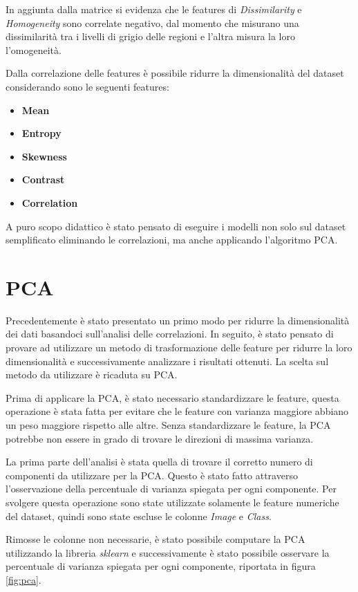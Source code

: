 In aggiunta dalla matrice si evidenza che le features di \textit{Dissimilarity}
e \textit{Homogeneity} sono correlate negativo, dal momento che misurano una dissimilarità
tra i livelli di grigio delle regioni e l'altra misura la loro l'omogeneità. 

Dalla correlazione delle features è possibile ridurre la dimensionalità del dataset
considerando sono le seguenti features:
\begin{itemize}
      \item \textbf{Mean}
      \item \textbf{Entropy}
      \item \textbf{Skewness}
      \item \textbf{Contrast}
      \item \textbf{Correlation}
\end{itemize}

A puro scopo didattico è stato pensato di eseguire i modelli non solo sul dataset
semplificato eliminando le correlazioni, ma anche applicando l'algoritmo PCA.

\section{PCA} \label{sec:pca}
Precedentemente è stato presentato un primo modo per ridurre la dimensionalità
dei dati basandoci sull'analisi delle correlazioni. In seguito, è stato pensato
di provare ad utilizzare un metodo di trasformazione delle feature per ridurre
la loro dimensionalità e successivamente analizzare i risultati ottenuti. La
scelta sul metodo da utilizzare è ricaduta su PCA.

Prima di applicare la PCA, è stato necessario standardizzare le feature, questa
operazione è stata fatta per evitare che le feature con varianza maggiore abbiano
un peso maggiore rispetto alle altre. Senza standardizzare le feature, la PCA
potrebbe non essere in grado di trovare le direzioni di massima varianza.

La prima parte dell'analisi è stata quella di trovare il corretto numero di
componenti da utilizzare per la PCA. Questo è stato fatto attraverso
l'osservazione della percentuale di varianza spiegata per ogni componente. Per
svolgere questa operazione sono state utilizzate solamente le feature numeriche
del dataset, quindi sono state escluse le colonne \textit{Image} e \textit{Class}.

Rimosse le colonne non necessarie, è stato possibile computare la PCA utilizzando
la libreria \textit{sklearn} e successivamente è stato possibile osservare la
percentuale di varianza spiegata per ogni componente, riportata in figura \ref{fig:pca}.

